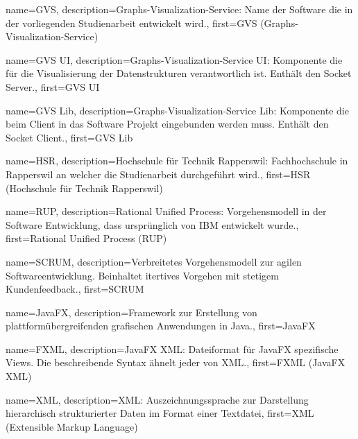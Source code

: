 



{
	name={GVS},
	description={Graphs-Visualization-Service: Name der Software die in der vorliegenden Studienarbeit entwickelt wird.},
	first={GVS (Graphs-Visualization-Service)}
}

{
	name={GVS UI},
	description={Graphs-Visualization-Service UI: Komponente die für die Visualisierung der Datenstrukturen verantwortlich ist. Enthält den Socket Server.},
	first={GVS UI}
}

{
	name={GVS Lib},
	description={Graphs-Visualization-Service Lib: Komponente die beim Client in das Software Projekt eingebunden werden muss. Enthält den Socket Client.},
	first={GVS Lib}
}


{
	name={HSR},
	description={Hochschule für Technik Rapperswil: Fachhochschule in Rapperswil an welcher die Studienarbeit durchgeführt wird.},
	first={HSR (Hochschule für Technik Rapperswil)}
}

{
	name={RUP},
	description={Rational Unified Process: Vorgehensmodell in der Software Entwicklung, dass ursprünglich von IBM entwickelt wurde.},
	first={Rational Unified Process (RUP)}
}

{
	name={SCRUM},
	description={Verbreitetes Vorgehensmodell zur agilen Softwareentwicklung. Beinhaltet itertives Vorgehen mit stetigem Kundenfeedback.},
	first={SCRUM}
}

{
	name={JavaFX},
	description={Framework zur Erstellung von plattformübergreifenden grafischen Anwendungen in Java.},
	first={JavaFX}
}

{
	name={FXML},
	description={JavaFX XML: Dateiformat für JavaFX spezifische Views. Die beschreibende Syntax ähnelt jeder von XML.},
	first={FXML (JavaFX XML)}
}

{
	name={XML},
	description={XML: Auszeichnungssprache zur Darstellung hierarchisch strukturierter Daten im Format einer Textdatei},
	first={XML (Extensible Markup Language)}
}

